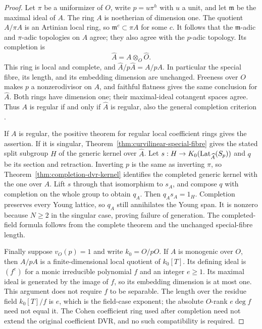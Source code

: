 \begin{proof}
Let $\pi$ be a uniformizer of $O$, write $p=u\pi^h$ with $u$
a unit, and let $\mathfrak m$ be the maximal ideal of $A$.
The ring $A$ is noetherian of dimension one.  The quotient
$A/\pi A$ is an Artinian local ring, so
$\mathfrak m^c\subset\pi A$ for some $c$.  It follows that
the $\mathfrak m$-adic and $\pi$-adic topologies on $A$ agree;
they also agree with the $p$-adic topology.  Its completion is
\[
 \widehat A=A\otimes_O\widehat O.
\]
This ring is local and complete, and
$\widehat A/p\widehat A=A/pA$.  In particular the special fibre,
its length, and its embedding dimension are unchanged.
Freeness over $O$ makes $p$ a nonzerodivisor on $A$, and faithful
flatness gives the same conclusion for $\widehat A$.
Both rings have dimension one; their maximal-ideal cotangent
spaces agree.  Thus $A$ is regular if and only if $\widehat A$
is regular, also the general completion criterion
\citep[Lemma~15.44.4, Tag~07NY]{Stacks2026}.

If $A$ is regular, the positive theorem for regular local
coefficient rings gives the assertion.  If it is singular,
Theorem~\ref{thm:curvilinear-special-fibre} gives the stated
split subgroup $H$ of the generic kernel over $\widehat A$.
Let $s:H\to K_0(\operatorname{Lat}_{\widehat A}(S_p))$ and $q$ be its
section and retraction.  Inverting $p$ is the same as inverting
$\pi$, so Theorem~\ref{thm:completion-dvr-kernel} identifies
the completed generic kernel with the one over $A$.
Lift $s$ through that isomorphism to $s_A$, and compose $q$
with completion on the whole group to obtain $q_A$.
Then $q_As_A=1_H$.  Completion preserves every Young lattice,
so $q_A$ still annihilates the Young span.  It is nonzero because
$N\geq2$ in the singular case, proving failure of generation.
The completed-field formula follows from the complete theorem
and the unchanged special-fibre length.

Finally suppose $v_O(p)=1$ and write $k_0=O/pO$.  If $A$ is
monogenic over $O$, then $A/pA$ is a finite-dimensional local
quotient of $k_0[T]$.  Its defining ideal is $(f^e)$ for a
monic irreducible polynomial $f$ and an integer $e\geq1$.
Its maximal ideal is generated by the image of $f$, so its
embedding dimension is at most one.  This argument does not
require $f$ to be separable.  The length over the residue field
$k_0[T]/f$ is $e$, which is the field-case exponent; the absolute
$O$-rank $e\deg f$ need not equal it.  The Cohen coefficient
ring used after completion need not extend the original
coefficient DVR, and no such compatibility is required.
\end{proof}


